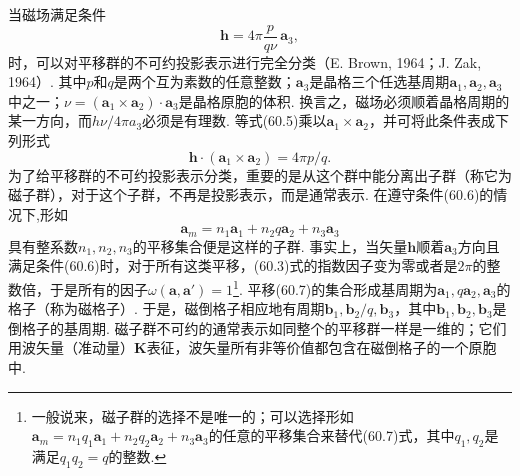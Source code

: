 当磁场满足条件
\begin{equation}
\bm h=4\pi\frac{p}{q\nu}\,\bm a_3,
\label{60.5}
\end{equation}
时，可以对平移群的不可约投影表示进行完全分类（E. Brown, 1964；J. Zak, 1964）. 其中$p$和$q$是两个互为素数的任意整数；$\bm a_3$是晶格三个任选基周期$\bm a_1,\bm a_2,\bm a_3$中之一；$\nu=(\bm a_1\times\bm a_2)\cdot\bm a_3$是晶格原胞的体积. 换言之，磁场必须顺着晶格周期的某一方向，而$h\nu/4\pi a_3$必须是有理数. 等式(60.5)乘以$\bm a_1\times\bm a_2$，并可将此条件表成下列形式
\begin{equation}
\bm h\cdot(\bm a_1\times\bm a_2)=4\pi p/q.
\label{60.6}
\end{equation}
为了给平移群的不可约投影表示分类，重要的是从这个群中能分离出子群（称它为磁子群），对于这个子群，不再是投影表示，而是通常表示. 在遵守条件(60.6)的情况下,形如
\begin{equation}
\bm a_m=n_1\bm a_1+n_2q\bm a_2+n_3\bm a_3
\label{60.7}
\end{equation}
具有整系数$n_1,n_2,n_3$的平移集合便是这样的子群. 事实上，当矢量$\bm h$顺着$\bm a_3$方向且满足条件(60.6)时，对于所有这类平移，(60.3)式的指数因子变为零或者是$2\pi$的整数倍，于是所有的因子$\omega(\bm a,\bm a')=1$\footnote{一般说来，磁子群的选择不是唯一的；可以选择形如$\bm a_m=n_1q_1\bm a_1+n_2q_2\bm a_2+n_3\bm a_3$的任意的平移集合来替代(60.7)式，其中$q_1,q_2$是满足$q_1q_2=q$的整数.}. 平移(60.7)的集合形成基周期为$\bm a_1,q\bm a_2,\bm a_3$的格子（称为磁格子）. 于是，磁倒格子相应地有周期$\bm b_1,\bm b_2/q,\bm b_3$，其中$\bm b_1,\bm b_2,\bm b_3$是倒格子的基周期. 磁子群不可约的通常表示如同整个的平移群一样是一维的；它们用波矢量（准动量）$\bm K$表征，波矢量所有非等价值都包含在磁倒格子的一个原胞中.

